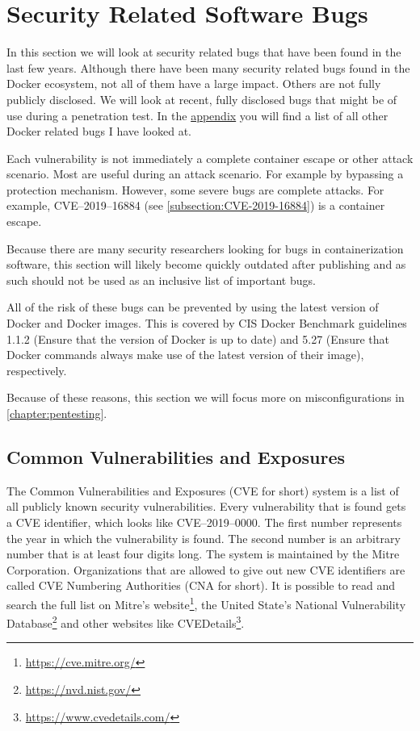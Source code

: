 \section{Security Related Software Bugs}\label{section:bugs}
In this section we will look at security related bugs that have been found in the last few years. Although there have been many security related bugs found in the Docker ecosystem, not all of them have a large impact. Others are not fully publicly disclosed. We will look at recent, fully disclosed bugs that might be of use during a penetration test. In the \hyperref[appendix:CVE-List]{appendix} you will find a list of all other Docker related bugs I have looked at.

Each vulnerability is not immediately a complete container escape or other attack scenario. Most are useful during an attack scenario. For example by bypassing a protection mechanism.
However, some severe bugs are complete attacks. For example, CVE--2019--16884 (see \autoref{subsection:CVE-2019-16884}) is a container escape.

\hfill

Because there are many security researchers looking for bugs in containerization software, this section will likely become quickly outdated after publishing and as such should not be used as an inclusive list of important bugs.

All of the risk of these bugs can be prevented by using the latest version of Docker and Docker images. This is covered by CIS Docker Benchmark guidelines 1.1.2 (Ensure that the version of Docker is up to date) and 5.27 (Ensure that Docker commands always make use of the latest version of their image), respectively.

Because of these reasons, this section we will focus more on misconfigurations in \autoref{chapter:pentesting}.

\subsection*{Common Vulnerabilities and Exposures}
The Common Vulnerabilities and Exposures (CVE for short) system is a list of all publicly known security vulnerabilities. Every vulnerability that is found gets a CVE identifier, which looks like CVE--2019--0000. The first number represents the year in which the vulnerability is found. The second number is an arbitrary number that is at least four digits long. The system is maintained by the Mitre Corporation. Organizations that are allowed to give out new CVE identifiers are called CVE Numbering Authorities (CNA for short). It is possible to read and search the full list on Mitre's website\footnote{\url{https://cve.mitre.org/}}, the United State's National Vulnerability Database\footnote{\url{https://nvd.nist.gov/}} and other websites like CVEDetails\footnote{\url{https://www.cvedetails.com/}}.

